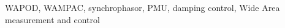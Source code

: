 \documentclass[journal]{IEEEtran}
\begin{document}
\begin{abstract}


\end{abstract}

\begin{IEEEkeywords}
WAPOD, WAMPAC, synchrophasor, PMU, damping control, Wide Area measurement and control
\end{IEEEkeywords}






%
\IEEEpeerreviewmaketitle
\end{document}

